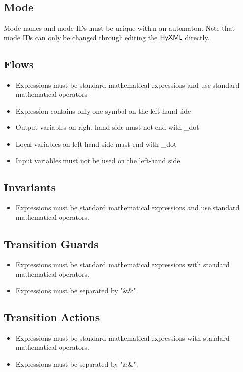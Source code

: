 \documentclass{tufte-book} %
\begin{document}
    \subsection{Mode}
        Mode names and mode IDs must be unique within an automaton. Note that mode IDs can only be changed through editing the ${{\sf HyXML}}$ directly. 
        \subsection{Flows}
            \begin{itemize}
                \item Expressions must be standard mathematical expressions and use standard mathematical operators
                \item Expression contains only one symbol on the left-hand side
                \item Output variables on right-hand side must not end with \_dot
                \item Local variables on left-hand side must end with \_dot
                \item Input variables must not be used on the left-hand side
            \end{itemize}
        \subsection{Invariants}
            \begin{itemize}
                \item Expressions must be standard mathematical expressions and use standard mathematical operators. 
            \end{itemize}
    \subsection{Transition Guards}
            \begin{itemize}
                \item Expressions must be standard mathematical expressions with standard mathematical operators. 
                \item Expressions must be separated by "\&\&". 
            \end{itemize}
        \subsection{Transition Actions}
            \begin{itemize}
                \item Expressions must be standard mathematical expressions with standard mathematical operators.
                \item Expressions must be separated by "\&\&".
            \end{itemize}
\end{document}
